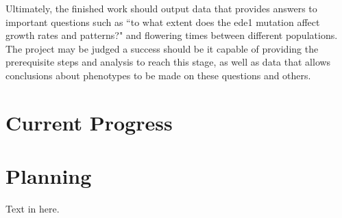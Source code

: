 \documentclass[11pt,fleqn,twoside]{article}
\begin{document}
Ultimately, the finished work should output data that provides answers to important questions such as ``to what extent does the ede1 mutation affect growth rates and patterns?" and flowering times between different populations. The project may be judged a success should be it capable of providing the prerequisite steps and analysis to reach this stage, as well as data that allows conclusions about phenotypes to be made on these questions and others.

\section{Current Progress}

\section{Planning}
Text in here.

%
%


\nocite{*} %

\newpage
{} 

%
%

\renewcommand{\refname}{Annotated Bibliography}  %
\end{document}
